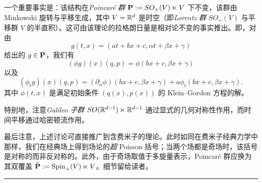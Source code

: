 一个重要事实是：该结构在\emph{Poincaré 群} $\bold P:=SO_+(V)\ltimes V$ 下不变，该群由 Minkowski 旋转与平移生成，其中 $V=\Bbb R^d$ 是时空（即\emph{Lorentz 群} $SO_+(V)$ 与平移群 $V$ 的半直积）。这可由该理论的拉格朗日量是相对论不变的事实推出。即，对由
$$
g(t,x)=(at+bx+c,\alpha t+\beta x+\gamma)
$$
给出的 $g\in \bold P$，我们有
$$
(\phi g)(x)(q,p)=\phi(bx+c,\beta x+\gamma)
$$
以及
$$
(\phi_tg)(x)(q,p)=(\partial_\alpha \phi)(bx+c,\beta x+\gamma)+a\phi_t (bx+c,\beta x+\gamma).
$$
其中 $\phi(t,x)$ 是满足初始条件 $(q(x),p(x))$ 的 Klein--Gordon 方程的解。

特别地，注意\emph{Galileo 子群} $SO(\Bbb R^{d-1})\ltimes \Bbb R^{d-1}$ 通过显式的几何对称性作用，而时间平移通过哈密顿流作用。

最后注意，上述讨论可直接推广到含费米子的理论。此时如同在费米子经典力学中那样，我们在经典场上得到场论的\emph{超} Poisson 括号；当两个场都是奇场时，该括号是对称的而非反对称的。此外，由于奇场取值于多旋量表示，Poincaré 群应换为其双覆盖 $\widetilde{\bold P}:={\rm Spin}_+(V)\ltimes V$。细节留给读者。

\bigskip
\noindent\rule{\textwidth}{0.6pt}
